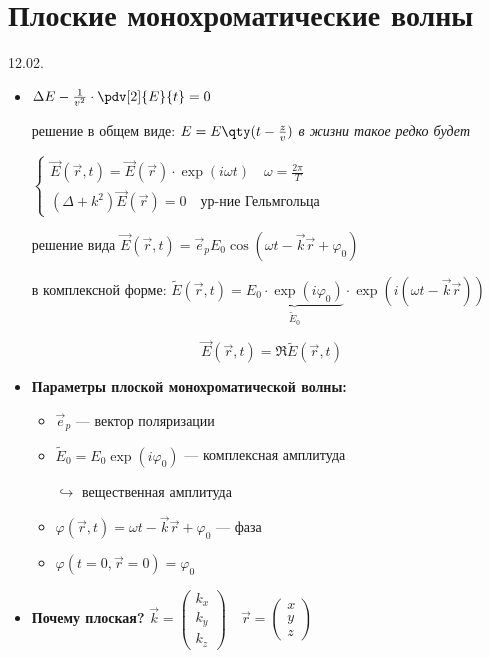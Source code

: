 \section{Плоские монохроматические волны}

12.02.
\begin{itemize}
	\item $\Delta E - \frac{1}{v^2} \cdot \pdv[2]{E}{t} = 0$ 
	
	решение в общем виде: $E = E\qty(t - \frac{z}{v})$ \quad * \textit{в жизни такое редко будет}
	
	$\begin{cases}
		\vec{E}(\vec{r}, t) = \vec{E}(\vec{r}) \cdot \exp(i\omega t) \quad \omega = \frac{2\pi}{T} \\
		(\Delta + k^2)\vec{E}(\vec{r}) = 0 \quad \text{ур-ние Гельмгольца}
	\end{cases}$
	
	решение вида $\vec{E}(\vec{r}, t) = \vec{e}_p E_0 \cos(\omega t - \vec{k}\vec{r} + \varphi_0)$
	
	в комплексной форме: $\widetilde{E}(\vec{r}, t) = \underbrace{E_0 \cdot \exp(i\varphi_0)}_{\widetilde{E}_0} \cdot \exp(i(\omega t - \vec{k}\vec{r}))$
	
	\begin{equation*}
		\vec{E}(\vec{r}, t) = \Re \widetilde{E}(\vec{r}, t)
	\end{equation*}
	
	\item \textbf{Параметры плоской монохроматической волны:}
	\begin{itemize}
		\item $\vec{e}_p$ --- вектор поляризации
		\item $\widetilde{E}_0 = E_0 \exp(i\varphi_0)$ --- комплексная амплитуда
		
		$\hookrightarrow$ вещественная амплитуда
		\item $\varphi(\vec{r}, t) = \omega t - \vec{k}\vec{r} + \varphi_0$ --- фаза
		\item $\varphi(t=0, \vec{r}=0) = \varphi_0$
	\end{itemize}
	
	\item \textbf{Почему плоская?} 
	$\vec{k} = \begin{pmatrix} k_x \\ k_y \\ k_z \end{pmatrix} \quad \vec{r} = \begin{pmatrix} x \\ y \\ z \end{pmatrix}$
	

\end{itemize}
